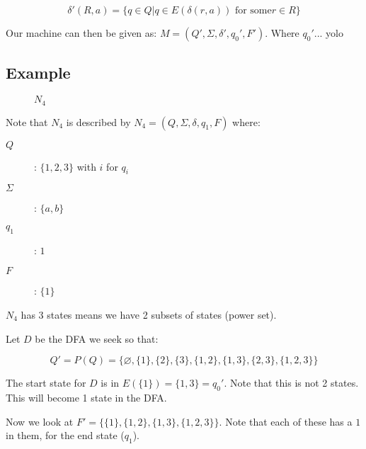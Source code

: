 \documentclass{article}
\begin{document}
\[
\delta'(R,a)=\{q\in{}Q|q\in E(\delta(r,a))\text{ for some}r\in{}R\}
\]

Our machine can then be given as:
$M=(Q',\Sigma,\delta',q_0',F')$. Where $q_0'$... yolo

\subsection*{Example}

\begin{figure}[H]
  \centering
  \caption{$N_4$}
\end{figure}

Note that $N_4$ is described by $N_4=(Q,\Sigma,\delta,q_1,F)$ where:

\begin{description}
\item[$Q$]: $\{1,2,3\}$ with $i$ for $q_i$
\item[$\Sigma$]: $\{a,b\}$
\item[$q_1$]: $1$
\item[$F$]: $\{1\}$
\end{description}

$N_4$ has 3 states means we have 2 subsets of states (power set).

Let $D$ be the DFA we seek so that:

\[
Q'=P(Q)=\{\varnothing,\{1\},\{2\},\{3\},\{1,2\},\{1,3\},\{2,3\},\{1,2,3\}\}
\]

The start state for $D$ is in $E(\{1\})=\{1,3\}=q_0'$. Note that this
is not 2 states. This will become 1 state in the DFA.

Now we look at $F'=\{\{1\},\{1,2\},\{1,3\},\{1,2,3\}\}$. Note that
each of these has a $1$ in them, for the end state ($q_1$).
\end{document}
